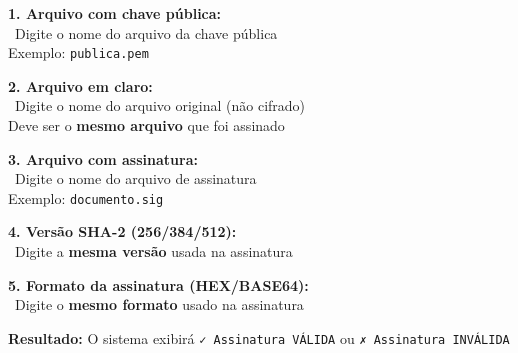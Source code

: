 \documentclass[12pt,a4paper]{article}
\begin{document}
\begin{tcolorbox}[colback=successgreen!10,colframe=successgreen,title={\faCheckCircle\ Campos para Verificação RSA}]

\textbf{1. Arquivo com chave pública:}\\
\quad \faUnlock\ Digite o nome do arquivo da chave pública\\
\quad Exemplo: \texttt{publica.pem}

\textbf{2. Arquivo em claro:}\\
\quad \faFileAlt\ Digite o nome do arquivo original (não cifrado)\\
\quad Deve ser o \textbf{mesmo arquivo} que foi assinado

\textbf{3. Arquivo com assinatura:}\\
\quad \faFileSignature\ Digite o nome do arquivo de assinatura\\
\quad Exemplo: \texttt{documento.sig}

\textbf{4. Versão SHA-2 (256/384/512):}\\
\quad \faHashtag\ Digite a \textbf{mesma versão} usada na assinatura

\textbf{5. Formato da assinatura (HEX/BASE64):}\\
\quad \faFileCode\ Digite o \textbf{mesmo formato} usado na assinatura

\end{tcolorbox}

\textbf{Resultado:} O sistema exibirá \texttt{✓ Assinatura VÁLIDA} ou \texttt{✗ Assinatura INVÁLIDA}
\end{document}
